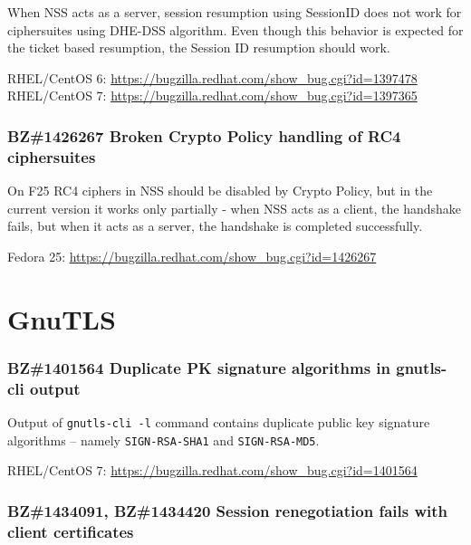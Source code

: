     When NSS acts as a server, session resumption using SessionID does not work
    for ciphersuites using DHE-DSS algorithm. Even though this behavior is
    expected for the ticket based resumption, the Session ID resumption should work.

    \medskip\noindent RHEL/CentOS 6: \url{https://bugzilla.redhat.com/show_bug.cgi?id=1397478}
    \newline\noindent RHEL/CentOS 7: \url{https://bugzilla.redhat.com/show_bug.cgi?id=1397365}

\subsubsection*{BZ\#1426267  \newline
    Broken Crypto Policy handling of RC4 ciphersuites}

    On F25 RC4 ciphers in NSS should be disabled by Crypto Policy, but in the
    current version it works only partially - when NSS acts as a client,
    the handshake fails, but when it acts as a server, the handshake is
    completed successfully.

    \medskip\noindent Fedora 25: \url{https://bugzilla.redhat.com/show_bug.cgi?id=1426267}

\section{GnuTLS}
\subsubsection*{BZ\#1401564  \newline
    Duplicate PK signature algorithms in gnutls-cli output}

    Output of \texttt{gnutls-cli -l} command contains duplicate public key signature
    algorithms -- namely \texttt{SIGN-RSA-SHA1} and \texttt{SIGN-RSA-MD5}.

    \medskip\noindent RHEL/CentOS 7: \url{https://bugzilla.redhat.com/show_bug.cgi?id=1401564}

\subsubsection*{BZ\#1434091, BZ\#1434420  \newline
    Session renegotiation fails with client certificates}

